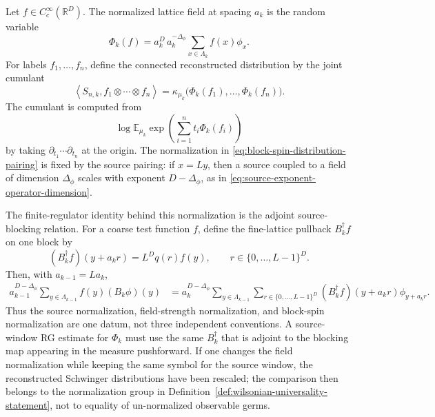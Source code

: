 \begin{construction}
\label{constr:short-range-block-spin-reconstruction}
Let \(f\in C_c^\infty(\mathbb R^D)\).  The normalized lattice field at
spacing \(a_k\) is the random variable
\begin{equation}
  \Phi_k(f)
  =
  a_k^D\,a_k^{-\Delta_\phi}
  \sum_{x\in\Lambda_k} f(x)\phi_x .
  \label{eq:block-spin-distribution-pairing}
\end{equation}
For labels \(f_1,\ldots,f_n\), define the connected reconstructed
distribution by the joint cumulant
\begin{equation}
  \left\langle S_{n,k},f_1\otimes\cdots\otimes f_n\right\rangle
  =
  \kappa_{\mu_k}\bigl(
    \Phi_k(f_1),\ldots,\Phi_k(f_n)
  \bigr).
  \label{eq:block-spin-cumulant-distribution}
\end{equation}
The cumulant is computed from
\[
  \log
  \mathbb E_{\mu_k}
  \exp\!\left(\sum_{i=1}^n t_i\Phi_k(f_i)\right)
\]
by taking \(\partial_{t_1}\cdots\partial_{t_n}\) at the origin.  The
normalization in \eqref{eq:block-spin-distribution-pairing} is fixed by the
source pairing: if \(x=Ly\), then a source coupled to a field of dimension
\(\Delta_\phi\) scales with exponent \(D-\Delta_\phi\), as in
\eqref{eq:source-exponent-operator-dimension}.

The finite-regulator identity behind this normalization is the adjoint
source-blocking relation.  For a coarse test function \(f\), define the
fine-lattice pullback \(B_k^\dagger f\) on one block by
\begin{equation}
  (B_k^\dagger f)(y+a_k r)
  =
  L^D q(r)f(y),
  \qquad r\in\{0,\ldots,L-1\}^D .
  \label{eq:short-range-adjoint-source-blocking}
\end{equation}
Then, with \(a_{k-1}=La_k\),
\begin{equation}
\begin{aligned}
  a_{k-1}^{D-\Delta_\phi}
  \sum_{y\in\Lambda_{k-1}} f(y)(B_k\phi)(y)
  &=
  a_k^{D-\Delta_\phi}
  \sum_{y\in\Lambda_{k-1}}
  \sum_{r\in\{0,\ldots,L-1\}^D}
    (B_k^\dagger f)(y+a_k r)\phi_{y+a_k r} .
\end{aligned}
  \label{eq:short-range-source-blocking-pairing-identity}
\end{equation}
Thus the source normalization, field-strength normalization, and block-spin
normalization are one datum, not three independent conventions.  A
source-window RG estimate for \(\Phi_k\) must use the same
\(B_k^\dagger\) that is adjoint to the blocking map appearing in the
measure pushforward.  If one changes the field normalization while keeping
the same symbol for the source window, the reconstructed Schwinger
distributions have been rescaled; the comparison then belongs to the
normalization group in
Definition~\ref{def:wilsonian-universality-statement}, not to equality of
un-normalized observable germs.


\end{construction}
